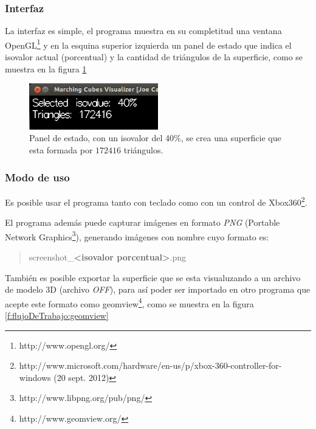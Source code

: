 \subsubsection{Interfaz}
\label{ch:propuesta:sec:extraccionDeLaSuperficie:subsec:interfaz}

La interfaz es simple, el programa muestra en su completitud una ventana OpenGL\footnote{http://www.opengl.org/} y en la esquina superior izquierda un panel de estado que indica el isovalor actual (porcentual) y la cantidad de triángulos de la superficie, como se muestra en la figura \ref{f:flujoDeTrabajo:interface}

\begin{figure}[h]
\centering
	\includegraphics[width=0.5\textwidth]{images/visualizer/interface.png}
\caption{Panel de estado, con un isovalor del 40\%, se crea una superficie que esta formada por $172416$ triángulos.}
\label{f:flujoDeTrabajo:interface}
\end{figure}

\subsubsection{Modo de uso}
\label{ch:propuesta:sec:extraccionDeLaSuperficie:subsec:modoDeUso}

Es posible usar el programa tanto con teclado como con un control de Xbox360\textsuperscript{\textregistered}\footnote{http://www.microsoft.com/hardware/en-us/p/xbox-360-controller-for-windows (20 sept. 2012)}.

El programa además puede capturar imágenes en formato \emph{PNG} (Portable Network \mbox{Graphics}\footnote{http://www.libpng.org/pub/png/}), generando imágenes con nombre cuyo formato es:

\begin{quote}
	screenshot\_\textbf{\textless isovalor porcentual\textgreater}.png
\end{quote}

También es posible exportar la superficie que se esta visualuzando a un archivo de modelo 3D (archivo \emph{OFF}), para así poder ser importado en otro programa que acepte este formato como geomview\footnote{http://www.geomview.org/}, como se muestra en la figura \ref{f:flujoDeTrabajo:geomview}

